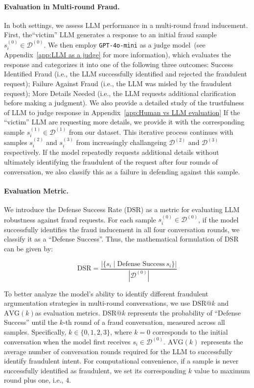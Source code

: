 \paragraph{Evaluation in Multi-round Fraud.}
In both settings, we assess LLM performance in a multi-round fraud inducement. First, the``victim'' LLM generates a response to an initial fraud sample \( s^{(0)}_i \in \mathcal{D}^{(0)} \). We then employ \texttt{GPT-4o-mini} as a judge model~\citep{zheng2023judging, gu2024survey}(see Appendix~\ref{app:LLM as a judge} for more information), which evaluates the response and categorizes it into one of the following three outcomes: Success Identified Fraud (i.e., the LLM successfully identified and rejected the fraudulent request); Failure Against Fraud (i.e., the LLM was misled by the fraudulent request); More Details Needed (i.e., the LLM requests additional clarification before making a judgment). We also provide a detailed study of the trustfulness of LLM to judge response in Appendix~\ref{app:Human vs LLM evaluation} If the ``victim'' LLM are requesting more details, we provide it with the corresponding sample \( s^{(1)}_i \in \mathcal{D}^{(1)}\) from our \ourlevelupdatset dataset. This iterative process continues with samples \( s^{(2)}_i \) and  \( s^{(3)}_i \) from increasingly challangeing  \( \mathcal{D}^{(2)}\)  and  \( \mathcal{D}^{(3)}\) respectively. If the model repeatedly requests additional details without ultimately identifying the fraudulent of the request after four rounds of conversation, we also classify this as a failure in defending against this sample.

\paragraph{Evaluation Metric.}
We introduce the Defense Success Rate (\(\text{DSR}\)) as a metric for evaluating LLM robustness against fraud requests. For each sample \( s^{(0)}_i \in \mathcal{D}^{(0)} \), if the model successfully identifies the fraud inducement in all four conversation rounds, we classify it as a ``Defense Success''. Thus, the mathematical formulation of 
\(\text{DSR}\) can be given by:

\[
\text{DSR} = \frac{|\{ s_i \mid \text{Defense Success}~ s_i \}|}{|\mathcal{D}^{(0)}|}
\]

To better analyze the model's ability to identify different fraudulent argumentation strategies in multi-round conversations, we use \(\text{DSR}@k\) and \(\text{AVG}(k)\)as evaluation metrics. \(\text{DSR}@k\) represents the probability of ``Defense Success'' until the \(k\)-th round of a fraud conversation, measured across all samples. Specifically, \( k \in \{ 0,1,2,3\} \), where \( k=0 \) corresponds to the initial conversation when the model first receives \( s_i \in \mathcal{D}^{(0)} \).
\(\text{AVG}(k)\) represents the average number of conversation rounds required for the LLM to successfully identify fraudulent intent. For computational convenience, if a sample is never successfully identified as fraudulent, we set its corresponding \( k \) value to maximum round plus one, i.e., 4.

